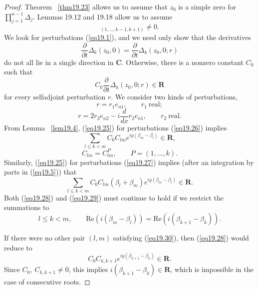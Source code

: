 \documentclass{surv-l}
\theoremstyle{plain}
\theoremstyle{definition}
\numberwithin{equation}{chapter}
\begin{document}
\begin{proof}
Theorem ~\ref{thm19.23} allows us to assume that $z_{0}$ is a simple zero for $\prod_{j=1}^{n-1}\Delta_{j}$. Lemmas 19.12 and 19.18 allow us to assume
\begin{equation*}
[f_{k}^{+}(z_{0})]_{(1,\ldots,k-1,k+1)}\neq 0.
\end{equation*}
We look for perturbations (\ref{eq19.1}), and we need only show that the derivatives
\begin{equation*}
\frac{\partial}{\partial t}\Delta_{k}(z_{0},0)=\frac{\partial}{\partial t}\Delta_{k}(z_{0},0;r)
\end{equation*}
do not all lie in a single direction in $\mathbf{C}$. Otherwise, there is a nonzero constant $C_{0}$ such that
\setcounter{equation}{24}
\begin{equation}\label{eq19.25}
C_{0}\frac{\partial}{\partial t}\Delta_{k}(z_{0},0;r)\in \mathbf{R}
\end{equation}
for every selfadjoint perturbation $r$. We consider two kinds of perturbations,
\begin{equation}\label{eq19.26}
r=r_{1}e_{n1}, \qquad  r_{1}\ \mathrm{real};
\end{equation}
\begin{equation}\label{eq19.27}
r=2r_{2}e_{n2}-i\frac{d}{dx}r_{2}e_{n1}, \qquad r_{2}\ \mathrm{real}.
\end{equation}
From Lemma ~\ref{lem19.4}, (\ref{eq19.25}) for perturbations (\ref{eq19.26}) implies
\begin{equation}\label{eq19.28}
\sum_{l\leq k<m}C_{0}C_{lm}e^{iy(\beta_{m}-\beta_{l})} \in \mathbf{R},
\end{equation}
\begin{equation*}
C_{lm}=C_{lm}^{P},\qquad P=(1, \ldots, k).
\end{equation*}
Similarly, (\ref{eq19.25}) for perturbations (\ref{eq19.27}) implies (after an integration by parts in (\ref{eq19.5})) that
\begin{equation}\label{eq19.29}
\sum_{l\leq k<m}C_{0}C_{lm}(\beta_{l}+\beta_{m})e^{iy(\beta_{m}-\beta_{l})}\in \mathbf{R}.
\end{equation}
Both (\ref{eq19.28}) and (\ref{eq19.29}) must continue to hold if we restrict the summations to
\begin{equation}\label{eq19.30}
l\leq k<m,\qquad \mathrm{Re}(i(\beta_{m}-\beta_{l}))=\mathrm{Re}(i(\beta_{k+1}-\beta_{k})).
\end{equation}

If there were no other pair $(l,m)$ satisfying (\ref{eq19.30}), then (\ref{eq19.28}) would reduce to
\begin{equation*}
C_{0}C_{k,k+1}e^{iy(\beta_{k+1}-\beta_{k})}\in \mathbf{R}.
\end{equation*}
Since $C_{0},\ C_{k,k+1}\neq 0$, this implies $i(\beta_{k+1}-\beta_{k})\in \mathbf{R}$, which is impossible in the case of consecutive roots.


\end{proof}
\end{document}
